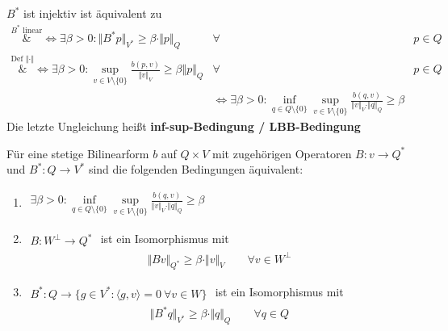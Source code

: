 $B^\ast$ ist injektiv ist äquivalent zu
\begin{align*}
	\overset{B^\ast\text{ linear}}&{\Longleftrightarrow}
	\exists\beta>0:\big\Vert B^\ast p\big\Vert_{V^\ast}\geq\beta\cdot\Vert p\Vert_Q &\forall& p\in Q\\
	\overset{\text{Def }\Vert\cdot\Vert}&\Longleftrightarrow \exists\beta>0:
	\sup\limits_{v\in V\setminus\lbrace0\rbrace}\frac{b(p,v)}{\Vert v\Vert_V}\geq\beta\Vert p\Vert_Q &\forall&p\in Q\\
	&\Longleftrightarrow\exists\beta>0:
	\inf\limits_{q\in Q\setminus\lbrace0\rbrace}\sup\limits_{v\in V\setminus\lbrace0\rbrace}\frac{b(q,v)}{\Vert v\Vert_V\cdot\Vert q\Vert_Q}\geq\beta
\end{align*}
Die letzte Ungleichung heißt \textbf{inf-sup-Bedingung / LBB-Bedingung}

\begin{thm} %
	Für eine stetige Bilinearform $b$ auf $Q\times V$ mit zugehörigen Operatoren
	$B\colon v\to Q^\ast$ und $B^\ast\colon Q\to V^\ast$ sind die folgenden Bedingungen äquivalent:
	\begin{enumerate}[label=(\roman*)]
		\item $\begin{aligned}
			\exists\beta>0:\inf\limits_{q\in Q\setminus\lbrace0\rbrace}\sup\limits_{v\in V\setminus\lbrace 0\rbrace}\frac{b(q,v)}{\Vert v\Vert_V\cdot\Vert q\Vert_Q}\geq\beta
		\end{aligned}$
		\item $\begin{aligned}
			B\colon W^\perp\to Q^\ast
		\end{aligned}$ ist ein Isomorphismus mit 
		\begin{align*}
			\Vert B v\Vert_{Q^\ast}\geq\beta\cdot\Vert v\Vert_V\qquad\forall v\in W^\perp
		\end{align*}
		\item $\begin{aligned}
			B^\ast\colon Q\to\big\lbrace g\in V^\ast:\langle g,v\rangle=0~\forall v\in W\big\rbrace
		\end{aligned}$ ist ein Isomorphismus mit
		\begin{align*}
			\big\Vert B^\ast q\big\Vert_{V^\ast}\geq\beta\cdot\Vert q\Vert_Q\qquad\forall q\in Q
		\end{align*}
	\end{enumerate}
\end{thm}

